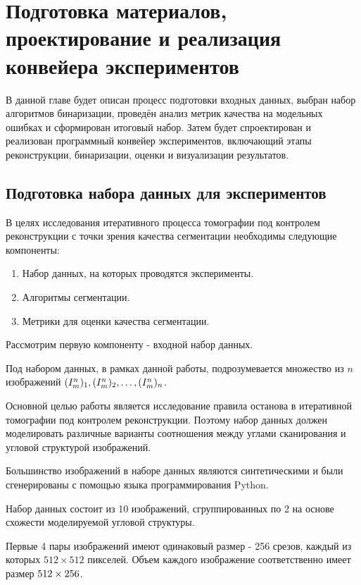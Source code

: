 \section{Подготовка материалов, проектирование и реализация конвейера экспериментов}

В данной главе будет описан процесс подготовки входных данных, выбран набор алгоритмов бинаризации, проведён анализ метрик качества на модельных ошибках и сформирован итоговый набор. Затем будет спроектирован и реализован программный конвейер экспериментов, включающий этапы реконструкции, бинаризации, оценки и визуализации результатов.

\subsection{Подготовка набора данных для экспериментов}

В целях исследования итеративного процесса томографии под контролем реконструкции с точки зрения качества сегментации необходимы следующие компоненты:
\begin{enumerate}

    \item Набор данных, на которых проводятся эксперименты.
    \item Алгоритмы сегментации.
    \item Метрики для оценки качества сегментации.
        
\end{enumerate}   

Рассмотрим первую компоненту - входной набор данных.

Под набором данных, в рамках данной работы, подрозумевается множество из \(n\) изображений \( (I^n_m)_1, (I^n_m)_2, \ldots, (I^n_m)_n \). 

Основной целью работы является исследование правила останова в итеративной томографии под контролем реконструкции. Поэтому набор данных должен моделировать различные варианты соотношения между углами сканирования и угловой структурой изображений.

Большинство изображений  в наборе данных являются синтетическими и были сгенерированы с помощью языка программирования Python.

Набор данных состоит из 10 изображений, сгруппированных по 2 на основе схожести моделируемой угловой структуры.

Первые 4 пары изображений имеют одинаковый размер - 256 срезов, каждый из которых \(512 \times 512\) пикселей. Объем каждого изображение соответственно имеет размер \(512 \time 512 \times 256\).

